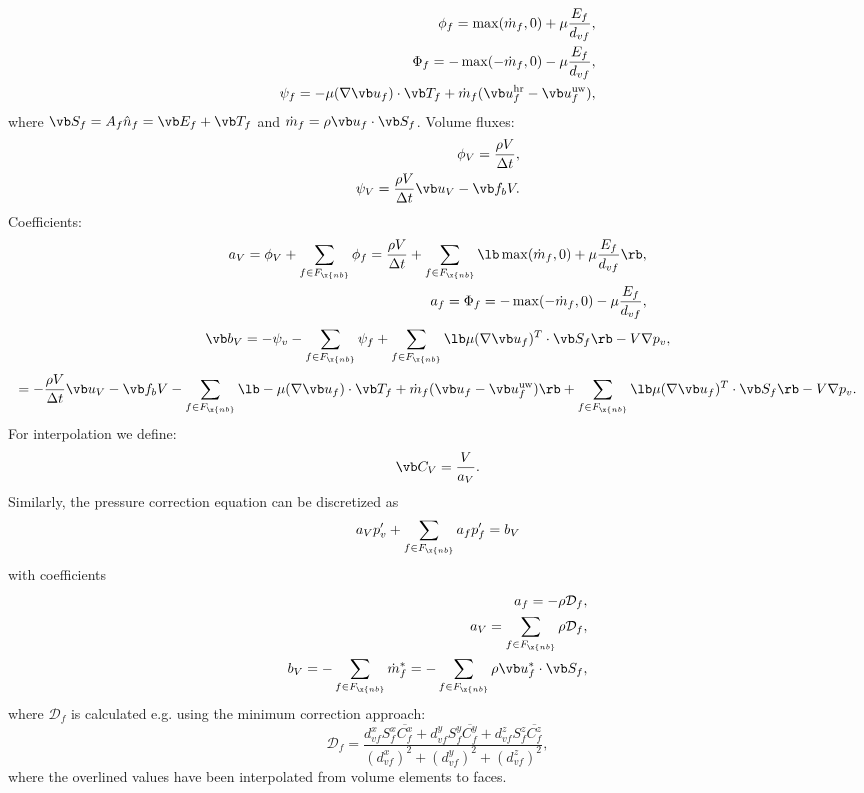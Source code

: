 \documentclass[12pt]{article}
\newcommand{\fnb}{F_{\x{nb}}}
\begin{document}
\begin{align}
  \phi_f = \max(\dot m_f, 0) + \mu \frac{E_f}{d_{vf}}, \\
  \Phi_f = -\max(-\dot m_f, 0) - \mu \frac{E_f}{d_{vf}}, \\
  \psi_f = - \mu (\nabla \vb u_f) \cdot \vb T_f + \dot m_f (\vb u_f^{\text{hr}} - \vb u_f^{\text{uw}}),
\end{align}
where $\vb S_f = A_f \hat n_f = \vb E_f + \vb T_f$ and $\dot m_f = \rho \vb u_f \cdot \vb S_f$.
Volume fluxes:
\begin{align}
  \phi_V = \frac{\rho V}{\Delta t}, \\
  \psi_V = \frac{\rho V}{\Delta t} \vb u_V - \vb f_b V.
\end{align}
Coefficients:
\begin{align}
  a_V = \phi_V + \sum_{f \in \fnb} \phi_f = \frac{\rho V}{\Delta t} + \sum_{f \in \fnb} \lb \max(\dot m_f, 0) + \mu \frac{E_f}{d_{vf}} \rb, \\
  a_f = \Phi_f = -\max(-\dot m_f, 0) - \mu \frac{E_f}{d_{vf}},
\end{align}
\begin{equation}
  \vb b_V = -\psi_v - \sum_{f \in \fnb} \psi_f + \sum_{f \in \fnb} \lb \mu (\nabla \vb u_f)^T \cdot \vb S_f \rb - V \nabla p_v,
\end{equation}
$$
= - \frac{\rho V}{\Delta t} \vb u_V - \vb f_b V - \sum_{f \in \fnb} \lb - \mu (\nabla \vb u_f) \cdot \vb T_f + \dot m_f (\vb u_f - \vb u_f^{\text{uw}}) \rb + \sum_{f \in \fnb} \lb \mu (\nabla \vb u_f)^T \cdot \vb S_f \rb - V \nabla p_v.
$$
For interpolation we define:
$$
\vb C_V = \frac{V}{a_V}.
$$
Similarly, the pressure correction equation can be discretized as \cite{mou}
\begin{equation}
  a_V p_v' + \sum_{f \in \fnb} a_f p_f' = b_V
\end{equation}
with coefficients
\begin{align}
  a_f = -\rho \mathcal{D}_f, \\
  a_V = \sum_{f \in \fnb} \rho \mathcal{D}_f,\\
  b_V = - \sum_{f \in \fnb} \dot m_f^* = - \sum_{f \in \fnb} \rho \vb u_f^* \cdot \vb S_f,
\end{align}
where $\mathcal{D}_f$ is calculated e.g. using the minimum correction approach:
$$
\mathcal{D}_f = \frac{d_{vf}^x S_f^x \overline{C_f^x} + d_{vf}^y S_f^y \overline{C_f^y} + d_{vf}^z S_f^z \overline{C_f^z}}{(d_{vf}^x)^2 + (d_{vf}^y)^2 + (d_{vf}^z)^2},
$$
where the overlined values have been interpolated from volume elements to faces.
\end{document}

